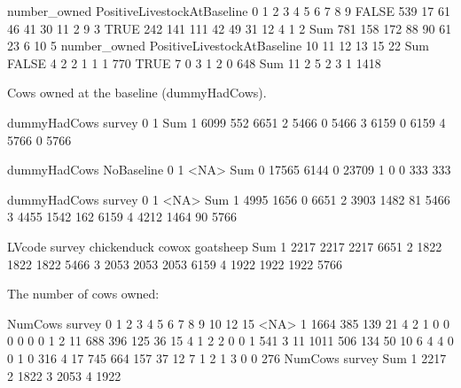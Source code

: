 \begin{Schunk}
\begin{Soutput}
                           number_owned
PositiveLivestockAtBaseline    0    1    2    3    4    5    6    7    8    9
                      FALSE  539   17   61   46   41   30   11    2    9    3
                      TRUE   242  141  111   42   49   31   12    4    1    2
                      Sum    781  158  172   88   90   61   23    6   10    5
                           number_owned
PositiveLivestockAtBaseline   10   11   12   13   15   22  Sum
                      FALSE    4    2    2    1    1    1  770
                      TRUE     7    0    3    1    2    0  648
                      Sum     11    2    5    2    3    1 1418
\end{Soutput}
\end{Schunk}
Cows owned at the baseline (\textsf{dummyHadCows}).
\begin{Schunk}
\begin{Soutput}
      dummyHadCows
survey    0    1  Sum
     1 6099  552 6651
     2 5466    0 5466
     3 6159    0 6159
     4 5766    0 5766
\end{Soutput}
\begin{Soutput}
          dummyHadCows
NoBaseline     0     1  <NA>   Sum
         0 17565  6144     0 23709
         1     0     0   333   333
\end{Soutput}
\begin{Soutput}
      dummyHadCows
survey    0    1 <NA>  Sum
     1 4995 1656    0 6651
     2 3903 1482   81 5466
     3 4455 1542  162 6159
     4 4212 1464   90 5766
\end{Soutput}
\begin{Soutput}
      LVcode
survey chickenduck cowox goatsheep  Sum
     1        2217  2217      2217 6651
     2        1822  1822      1822 5466
     3        2053  2053      2053 6159
     4        1922  1922      1922 5766
\end{Soutput}
\end{Schunk}
The number of cows owned:
\begin{Schunk}
\begin{Soutput}
      NumCows
survey    0    1    2    3    4    5    6    7    8    9   10   12   15 <NA>
     1 1664  385  139   21    4    2    1    0    0    0    0    0    0    1
     2   11  688  396  125   36   15    4    1    2    2    0    0    1  541
     3   11 1011  506  134   50   10    6    4    4    0    0    1    0  316
     4   17  745  664  157   37   12    7    1    2    1    3    0    0  276
      NumCows
survey  Sum
     1 2217
     2 1822
     3 2053
     4 1922
\end{Soutput}
\end{Schunk}
